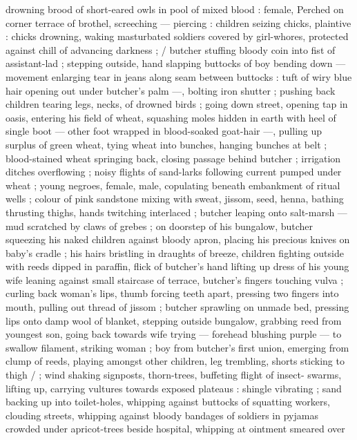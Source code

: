 drowning brood of short-eared owls in pool of mixed blood : female, 
Perched on corner terrace of brothel, screeching --- piercing : 
children seizing chicks, plaintive : chicks drowning, waking 
masturbated soldiers covered by girl-whores, protected against chill 
of advancing darkness ; {\slash} butcher stuffing bloody coin into fist of 
assistant-lad ; stepping outside, hand slapping buttocks of boy 
bending down --- movement enlarging tear in jeans along seam 
between buttocks : tuft of wiry blue hair opening out under butcher's 
palm ---, bolting iron shutter ; pushing back children tearing legs, 
necks, of drowned birds ; going down street, opening tap in oasis, 
entering his field of wheat, squashing moles hidden in earth with 
heel of single boot --- other foot wrapped in blood-soaked goat-hair 
---, pulling up surplus of green wheat, tying wheat into bunches, 
hanging bunches at belt ; blood-stained wheat springing back, 
closing passage behind butcher ; irrigation ditches overflowing ; 
noisy flights of sand-larks following current pumped under wheat ; 
young negroes, female, male, copulating beneath embankment of 
ritual wells ; colour of pink sandstone mixing with sweat, jissom, 
seed, henna, bathing thrusting thighs, hands twitching interlaced ; 
butcher leaping onto salt-marsh --- mud scratched by claws of 
grebes ; on doorstep of his bungalow, butcher squeezing his naked 
children against bloody apron, placing his precious knives on baby's 
cradle ; his hairs bristling in draughts of breeze, children fighting 
outside with reeds dipped in paraffin, flick of butcher's hand lifting 
up dress of his young wife leaning against small staircase of terrace, 
butcher's fingers touching vulva ; curling back woman's lips, thumb 
forcing teeth apart, pressing two fingers into mouth, pulling out 
thread of jissom ; butcher sprawling on unmade bed, pressing lips 
onto damp wool of blanket, stepping outside bungalow, grabbing 
reed from youngest son, going back towards wife trying --- forehead 
blushing purple --- to swallow filament, striking woman ; boy from 
butcher's first union, emerging from clump of reeds, playing 
amongst other children, leg trembling, shorts sticking to thigh{\td} {\slash} ; 
wind shaking signposts, thorn-trees, buffeting flight of insect- 
swarms, lifting up, carrying vultures towards exposed plateaus : 
shingle vibrating ; sand backing up into toilet-holes, whipping 
against buttocks of squatting workers, clouding streets, whipping 
against bloody bandages of soldiers in pyjamas crowded under 
apricot-trees beside hospital, whipping at ointment smeared over 
